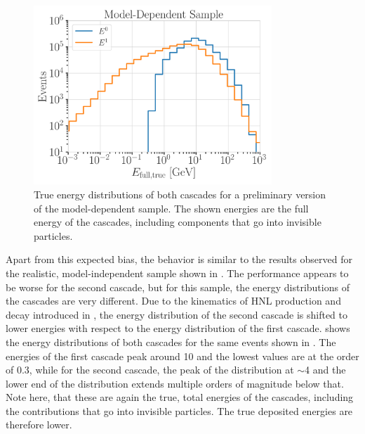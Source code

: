 \begin{figure}[h]
    \includegraphics[width=0.8\textwidth]{figures/results/190607/190607_1_d_distr_cascades_final_level.png}
    \caption[True cascade energies - preliminary model-dependent sample]{True energy distributions of both cascades for a preliminary version of the model-dependent sample. The shown energies are the full energy of the cascades, including components that go into invisible particles.}
\end{figure}

Apart from this expected bias, the behavior is similar to the results observed for the realistic, model-independent sample shown in . The performance appears to be worse for the second cascade, but for this sample, the energy distributions of the cascades are very different. Due to the kinematics of HNL production and decay introduced in , the energy distribution of the second cascade is shifted to lower energies with respect to the energy distribution of the first cascade.  shows the energy distributions of both cascades for the same events shown in . The energies of the first cascade peak around \SI{10}{\gev} and the lowest values are at the order of \SI{0.3}{\gev}, while for the second cascade, the peak of the distribution at $\sim$\SI{4}{\gev} and the lower end of the distribution extends multiple orders of magnitude below that. Note here, that these are again the true, total energies of the cascades, including the contributions that go into invisible particles. The true deposited energies are therefore lower.

